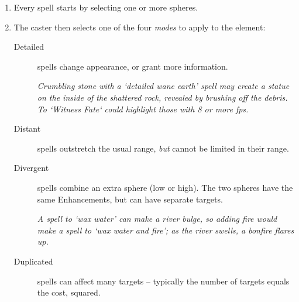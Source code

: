 \begin{multicols}{2}

\begin{enumerate}
  \item
  Every spell starts by selecting one or more spheres.
  \item
  The caster then selects one of the four \textit{modes} to apply to the element:
  \begin{description}
    \item[Detailed]
    spells change appearance, or grant more information.

    \textit{Crumbling stone with a `detailed wane earth' spell may create a statue on the inside of the shattered rock, revealed by brushing off the debris.
    To `Witness Fate` could highlight those with 8 or more \glspl{fp}.}
    \item[Distant]
    spells outstretch the usual range, \emph{but} cannot be limited in their range.
    \item[Divergent]
    spells combine an extra sphere (low or high). The two spheres have the same   Enhancements, but can have separate targets.

    \textit{A spell to `wax water' can make a river bulge, so adding fire would make a spell to `wax water and fire'; as the river swells, a bonfire flares up.}
    \item[Duplicated]
    spells can affect many targets -- typically the number of targets equals the cost, squared.
  \end{description}
\end{enumerate}

\end{multicols}

